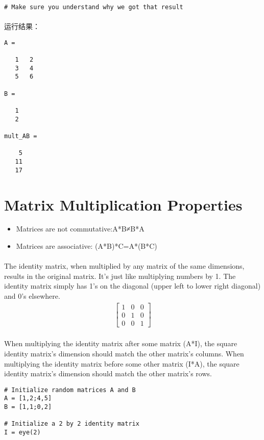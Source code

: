 \documentclass{article}
\begin{document}
\begin{CJK}{UTF8}{gbsn}
\begin{verbatim}
# Make sure you understand why we got that result
\end{verbatim}
\paragraph{}
运行结果：
\begin{verbatim}
A =

   1   2
   3   4
   5   6

B =

   1
   2

mult_AB =

    5
   11
   17
\end{verbatim}
\section{Matrix Multiplication Properties}
\begin{itemize}
\item Matrices are not commutative:A*B≠B*A
\item Matrices are associative: (A*B)*C=A*(B*C)
\end{itemize}
\paragraph{}
The identity matrix, when multiplied by any matrix of the same dimensions, results in the original matrix. It's just like multiplying numbers by 1. The identity matrix simply has 1's on the diagonal (upper left to lower right diagonal) and 0's elsewhere.
\begin{eqnarray*}
\left[\begin{array}{ccc}
1&0&0\\
0&1&0\\
0&0&1
\end{array}\right]
\end{eqnarray*}
\paragraph{}
When multiplying the identity matrix after some matrix (A*I), the square identity matrix's dimension should match the other matrix's columns. When multiplying the identity matrix before some other matrix (I*A), the square identity matrix's dimension should match the other matrix's rows.
\begin{verbatim}
# Initialize random matrices A and B 
A = [1,2;4,5]
B = [1,1;0,2]

# Initialize a 2 by 2 identity matrix
I = eye(2)


\end{verbatim}
\end{CJK}
\end{document}
